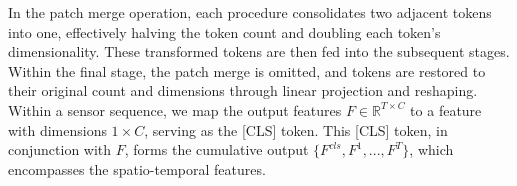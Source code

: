 \documentclass[letterpaper]{article} %
\begin{document}
In the patch merge operation, each procedure consolidates two adjacent tokens into one, effectively halving the token count and doubling each token's dimensionality. These transformed tokens are then fed into the subsequent stages. Within the final stage, the patch merge is omitted, and tokens are restored to their original count and dimensions through linear projection and reshaping. 
Within a sensor sequence, we map the output features $F \in \mathbb{R}^{T\times C}$ to a feature with dimensions $1\times C$, serving as the [CLS] token. This [CLS] token, in conjunction with $F$, forms the cumulative output $\{F^{cls}, F^{1}, ..., F^{T}\}$, which encompasses the spatio-temporal features.







\end{document}
